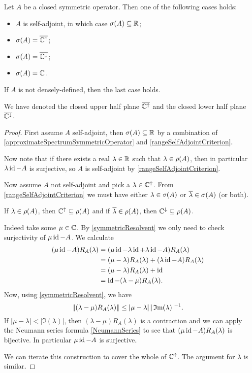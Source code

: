 \begin{proposition}
Let $A$ be a closed symmetric operator. Then one of the following cases holds:
\begin{itemize}
\item $A$ is self-adjoint, in which case $\sigma(A) \subseteq \mathbb{R}$;
\item $\sigma(A) = \overline{\mathbb{C}^{\uparrow}}$;
\item $\sigma(A) = \overline{\mathbb{C}^{\downarrow}}$;
\item $\sigma(A) = \mathbb{C}$.
\end{itemize}
If $A$ is not densely-defined, then the last case holds.
\end{proposition}
We have denoted the closed upper half plane $\overline{\mathbb{C}^{\uparrow}}$ and the closed lower half plane $\overline{\mathbb{C}^{\downarrow}}$.
\begin{proof}
First assume $A$ self-adjoint, then $\sigma(A)\subseteq \mathbb{R}$ by a combination of \ref{approximateSpectrumSymmetricOperator} and \ref{rangeSelfAdjointCriterion}.

Now note that if there exists a real $\lambda\in\mathbb{R}$ such that $\lambda \in \rho(A)$, then in particular $\lambda\operatorname{id} -A$ is surjective, so $A$ is self-adjoint by \ref{rangeSelfAdjointCriterion}.

Now assume $A$ not self-adjoint and pick a $\lambda\in \mathbb{C}^{\uparrow}$. From \ref{rangeSelfAdjointCriterion} we must have either $\lambda\in\sigma(A)$ or $\overline{\lambda}\in\sigma(A)$ (or both).

If $\lambda\in \rho(A)$, then $\mathbb{C}^\uparrow \subseteq \rho(A)$ and if $\overline{\lambda}\in\rho(A)$, then $\mathbb{C}^\downarrow \subseteq \rho(A)$.

Indeed take some $\mu\in\mathbb{C}$.
By \ref{symmetricResolvent} we only need to check surjectivity of $\mu\operatorname{id} - A$. We calculate
\begin{align*}
(\mu\operatorname{id} - A)R_A(\lambda) &= (\mu\operatorname{id} -\lambda\operatorname{id}+\lambda\operatorname{id} - A)R_A(\lambda) \\
&= (\mu-\lambda)R_A(\lambda) + (\lambda\operatorname{id}-A)R_A(\lambda) \\
&= (\mu-\lambda)R_A(\lambda) + \operatorname{id} \\
&= \operatorname{id} - (\lambda-\mu)R_A(\lambda).
\end{align*}
Now, using \ref{symmetricResolvent}, we have
\[ \lVert(\lambda-\mu)R_A(\lambda)\rVert \leq |\mu-\lambda| \, |\operatorname{\mathfrak{I}m}(\lambda)|^{-1}. \]
If $|\mu-\lambda| < |\Im(\lambda)|$, then $(\lambda-\mu)R_A(\lambda)$ is a contraction and we can apply the Neumann series formula \ref{NeumannSeries} to see that $(\mu\operatorname{id} - A)R_A(\lambda)$ is bijective. In particular $\mu\operatorname{id} - A$ is surjective.

We can iterate this construction to cover the whole of $\mathbb{C}^\uparrow$. The argument for $\overline{\lambda}$ is similar.
\end{proof}

